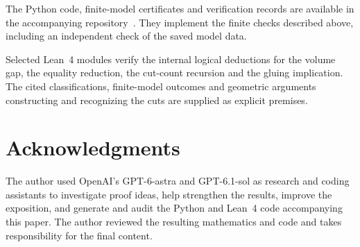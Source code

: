 \documentclass[11pt]{article}
\theoremstyle{remark}
\begin{document}
The Python code, finite-model certificates and verification records
are available in the accompanying repository~\cite{Repository}.
They implement the finite checks described above, including an
independent check of the saved model data.

Selected Lean~4 modules verify the internal logical deductions
for the volume gap, the equality reduction, the cut-count recursion
and the gluing implication. The cited classifications, finite-model
outcomes and geometric arguments constructing and recognizing the
cuts are supplied as explicit premises.

\section*{Acknowledgments}
The author used OpenAI's GPT-6-astra and GPT-6.1-sol as research and coding
assistants to investigate proof ideas, help strengthen the results, improve
the exposition, and generate and audit the Python and Lean~4 code
accompanying this paper. The author reviewed the resulting mathematics
and code and takes responsibility for the final content.



\end{document}
